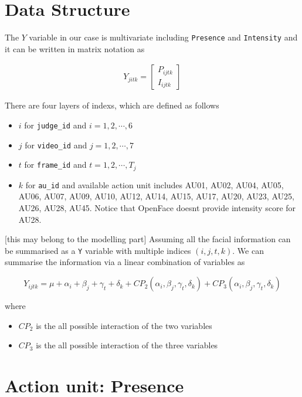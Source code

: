 \documentclass{monashthesis}
\begin{document}
\hypertarget{data-structure}{%
\section{Data Structure}\label{data-structure}}

The \(Y\) variable in our case is multivariate including \texttt{Presence} and \texttt{Intensity} and it can be written in matrix notation as

\begin{align}
Y_{jitk} = 
\begin{bmatrix}
P_{ijtk} \\
I_{ijtk}
\end{bmatrix}
\end{align}

There are four layers of indexs, which are defined as follows

\begin{itemize}
\tightlist
\item
  \(i\) for \texttt{judge\_id} and \(i = 1,2, \cdots, 6\)
\item
  \(j\) for \texttt{video\_id} and \(j = 1,2, \cdots, 7\)
\item
  \(t\) for \texttt{frame\_id} and \(t = 1,2, \cdots, T_j\)
\item
  \(k\) for \texttt{au\_id} and available action unit includes AU01, AU02, AU04, AU05, AU06, AU07, AU09, AU10, AU12, AU14, AU15, AU17, AU20, AU23, AU25, AU26, AU28, AU45. Notice that OpenFace doesnt provide intensity score for AU28.
\end{itemize}

{[}this may belong to the modelling part{]}
Assuming all the facial information can be summarised as a \texttt{Y} variable with multiple indices \((i,j,t,k)\). We can summarise the information via a linear combination of variables as

\[Y_{ijtk} = \mu + \alpha_i + \beta_j + \gamma_t + \delta_k + CP_2(\alpha_i, \beta_j, \gamma_t, \delta_k) + CP_3(\alpha_i, \beta_j, \gamma_t, \delta_k)\]

where

\begin{itemize}
\tightlist
\item
  \(CP_2\) is the all possible interaction of the two variables
\item
  \(CP_3\) is the all possible interaction of the three variables
\end{itemize}

\hypertarget{action-unit-presence}{%
\section{Action unit: Presence}\label{action-unit-presence}}
\end{document}
